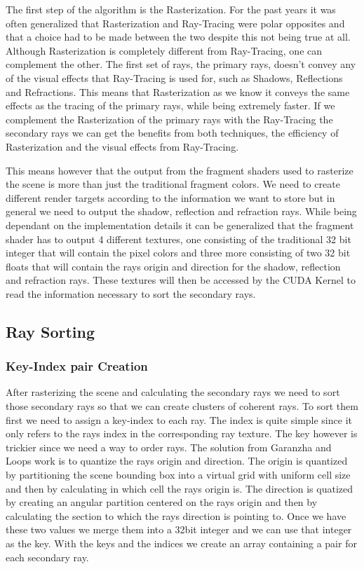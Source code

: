 \documentclass{llncs}
\begin{document}
The first step of the algorithm is the Rasterization. For the past years it was often generalized that Rasterization and Ray-Tracing were polar opposites and that a choice had to be 	made between the two despite this not being true at all. Although Rasterization is completely different from Ray-Tracing, one can complement the other. The first set of rays, the primary rays, doesn't convey any of the visual effects that Ray-Tracing is used for, such as Shadows, Reflections and Refractions. This means that Rasterization as we know it conveys the same effects as the tracing of the primary rays, while being extremely faster. If we complement the Rasterization of the primary rays with the Ray-Tracing the secondary rays we can get the benefits from both techniques, the efficiency of Rasterization and the visual effects from Ray-Tracing.


\medskip

This means however that the output from the fragment shaders used to rasterize the scene is more than just the traditional fragment colors. We need to create different render targets according to the information we want to store but in general we need to output the shadow, reflection and refraction rays. While being dependant on the implementation details it can be generalized that the fragment shader has to output 4 different textures, one consisting of the traditional 32 bit integer that will contain the pixel colors and three more consisting of two 32 bit floats that will contain the rays origin and direction for the shadow, reflection and refraction rays. These textures will then be accessed by the CUDA Kernel to read the information necessary to sort the secondary rays.


%
\subsection{Ray Sorting}
%

%
\subsubsection{Key-Index pair Creation}
%

After rasterizing the scene and calculating the secondary rays we need to sort those secondary rays so that we can create clusters of coherent rays. To sort them first we need to assign a key-index to each ray. The index is quite simple since it only refers to the rays index in the corresponding ray texture. The key however is trickier since we need a way to order rays. The solution from Garanzha and Loops work \cite{GaranzhaLoop10} is to quantize the rays origin and direction. The origin is quantized by partitioning the scene bounding box into a virtual grid with uniform cell size and then by calculating in which cell the rays origin is. The direction is quatized by creating an angular partition centered on the rays origin and then by calculating the section to which the rays direction is pointing to. Once we have these two values we merge them into a 32bit integer and we can use that integer as the key. With the keys and the indices we create an array containing a pair for each secondary ray.
\end{document}
